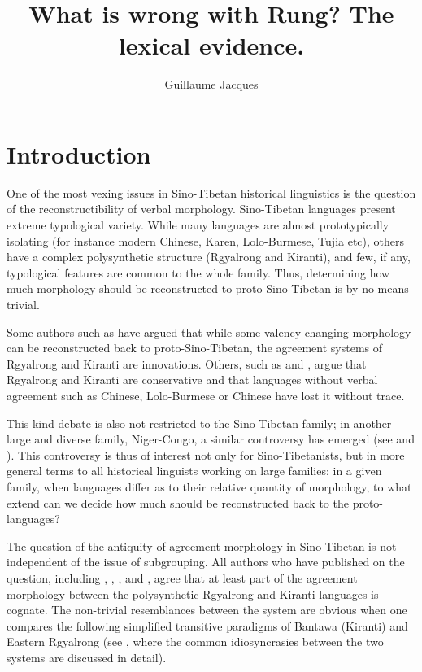 \documentclass[oldfontcommands,oneside,a4paper,11pt]{article}
\begin{document}
 


\title{What is wrong with Rung? The lexical evidence.}
\author{Guillaume Jacques}
\maketitle

\section{Introduction}
One of the most vexing issues in Sino-Tibetan historical linguistics is the question of the reconstructibility of verbal morphology. Sino-Tibetan languages present extreme  typological variety. While many  languages are almost prototypically isolating (for instance modern Chinese, Karen, Lolo-Burmese, Tujia etc), others  have a complex polysynthetic structure (Rgyalrong and Kiranti), and few, if any, typological features are common to the whole family. Thus, determining   how much morphology should be reconstructed to proto-Sino-Tibetan is by no means trivial. 

Some authors such as  \citet{lapolla03} have argued that while some valency-changing morphology can be reconstructed back to proto-Sino-Tibetan, the agreement systems of Rgyalrong and Kiranti are innovations. Others, such as  \citet{driem93agreement}  and \citet{delancey10agreement}, argue that Rgyalrong and Kiranti are conservative and that languages without verbal agreement such as Chinese, Lolo-Burmese or Chinese have lost it without trace.
 
This kind debate is also not restricted to the Sino-Tibetan family; in another large and diverse family, Niger-Congo, a similar controversy has emerged (see  \citealt{guldeman08macrosudan} and  \citealt{hyman11macrosudan}).  This controversy is thus of   interest not only for Sino-Tibetanists, but in more general terms to all historical linguists working on large families: in a given family,  when languages differ as to their relative quantity of morphology, to what extend can we decide how much should be reconstructed back to the proto-languages?

The question of the antiquity of agreement morphology in Sino-Tibetan is not independent of the issue of subgrouping. All authors who have published on the question, including  \citet{ebert90rung}, \citet{driem93agreement}, \citet{lapolla03}, \citet{delancey10agreement} and \citet{jacques12agreement}, agree that at least part of the agreement morphology between the polysynthetic Rgyalrong and Kiranti languages is cognate. The non-trivial resemblances between the system are obvious when one compares  the following simplified transitive paradigms of Bantawa (Kiranti) and Eastern Rgyalrong (see \citealt{jacques12agreement}, where the common idiosyncrasies between the two systems are discussed in detail). 
\end{document}

